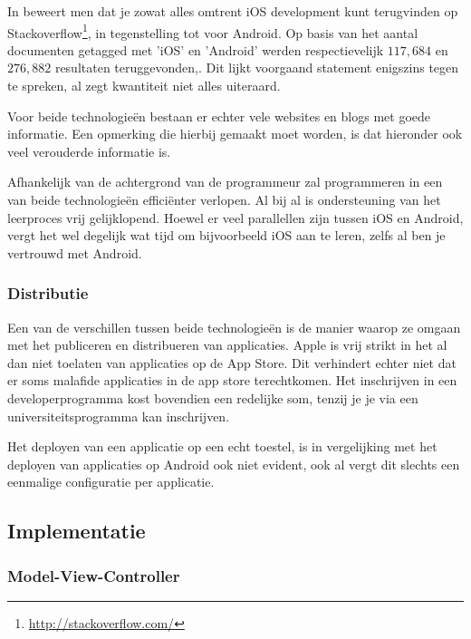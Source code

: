 In \cite{frederick2012} beweert men dat je zowat alles omtrent iOS development kunt terugvinden op Stackoverflow\footnote{\url{http://stackoverflow.com/}}, in tegenstelling tot voor Android. Op basis van het aantal documenten getagged met 'iOS' en 'Android' werden respectievelijk $117,684$ en $276,882$ resultaten teruggevonden\cite{stackoverflow2013ios},\cite{stackoverflow2013android}. Dit lijkt voorgaand statement enigszins tegen te spreken, al zegt kwantiteit niet alles uiteraard.

Voor beide technologie\"en bestaan er echter vele websites en blogs met goede informatie. Een opmerking die hierbij gemaakt moet worden, is dat hieronder ook veel verouderde informatie is.

Afhankelijk van de achtergrond van de programmeur zal programmeren in een van beide technologie\"en effici\"enter verlopen. Al bij al is ondersteuning van het leerproces vrij gelijklopend\cite{goadrich2011}. Hoewel er veel parallellen zijn tussen iOS en Android, vergt het wel degelijk wat tijd om bijvoorbeeld iOS aan te leren, zelfs al ben je vertrouwd met Android.


\subsubsection{Distributie}

Een van de verschillen tussen beide technologie\"en is de manier waarop ze omgaan met het publiceren en distribueren van applicaties. Apple is vrij strikt in het al dan niet toelaten van applicaties op de App Store.  Dit verhindert echter niet dat er soms malafide applicaties in de app store terechtkomen\cite{knack2012}. Het inschrijven in een developerprogramma kost bovendien een redelijke som, tenzij je je via een universiteitsprogramma kan inschrijven\cite{apple2013}.

Het deployen van een applicatie op een echt toestel, is in vergelijking met het deployen van applicaties op Android ook niet evident, ook al vergt dit slechts een eenmalige configuratie per applicatie\cite{weimenglee2009}.


\subsection{Implementatie}

\subsubsection{Model-View-Controller}

